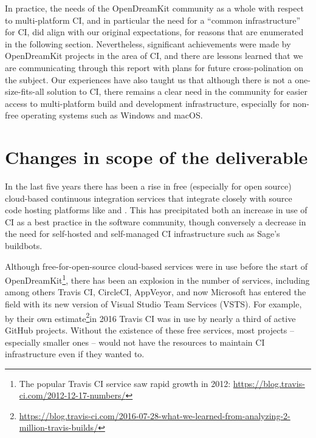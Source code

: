 \documentclass{deliverablereport}
\begin{document}
In practice, the needs of the OpenDreamKit community as a whole with respect to
multi-platform CI, and in particular the need for a ``common infrastructure''
for CI, did align with our original expectations, for reasons that are
enumerated in the following section.  Nevertheless, significant achievements
were made by OpenDreamKit projects in the area of CI, and there are lessons
learned that we are communicating through this report with plans for future
cross-polination on the subject.  Our experiences have also taught us that
although there is not a one-size-fits-all solution to CI, there remains a clear
need in the community for easier access to multi-platform build and development
infrastructure, especially for non-free operating systems such as Windows and macOS.

\hypertarget{changes-to-deliverable}{%
\section{Changes in scope of the deliverable}\label{changes-to-deliverable}}

In the last five years there has been a rise in free (especially for open
source) cloud-based continuous integration services that integrate closely with
source code hosting platforms like \GitHub and \GitLab.  This has precipitated
both an increase in use of CI as a best practice in the software community,
though conversely a decrease in the need for self-hosted and self-managed CI
infrastructure such as Sage's buildbots.

Although free-for-open-source cloud-based services were in use before the start
of OpenDreamKit\footnote{The popular Travis CI service saw rapid growth in
2012: \url{https://blog.travis-ci.com/2012-12-17-numbers/}}, there has been an
explosion in the number of services, including among others Travis CI,
CircleCI, AppVeyor, and now Microsoft has entered the field with its new
version of Visual Studio Team Services (VSTS).  For example, by their own
estimate\footnote{\url{https://blog.travis-ci.com/2016-07-28-what-we-learned-from-analyzing-2-million-travis-builds/}}in
2016 Travis CI was in use by nearly a third of active GitHub projects.  Without
the existence of these free services, most projects -- especially smaller
ones -- would not have the resources to maintain CI infrastructure even if they
wanted to.
\end{document}

